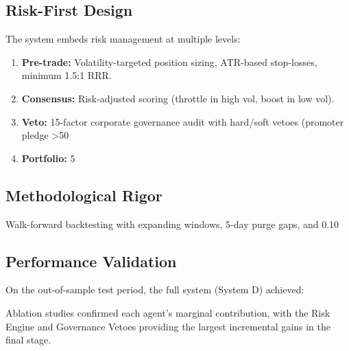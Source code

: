 \documentclass[12pt,a4paper]{report}
\begin{document}
\subsection{Risk-First Design}
The system embeds risk management at multiple levels:
\begin{enumerate}
\item \textbf{Pre-trade:} Volatility-targeted position sizing, ATR-based stop-losses, minimum 1.5:1 RRR.
\item \textbf{Consensus:} Risk-adjusted scoring (throttle in high vol, boost in low vol).
\item \textbf{Veto:} 15-factor corporate governance audit with hard/soft vetoes (promoter pledge >50%
\item \textbf{Portfolio:} 5%
\end{enumerate}

\subsection{Methodological Rigor}
Walk-forward backtesting with expanding windows, 5-day purge gaps, and 0.10%

\subsection{Performance Validation}
On the out-of-sample test period, the full system (System D) achieved:

Ablation studies confirmed each agent's marginal contribution, with the Risk Engine and Governance Vetoes providing the largest incremental gains in the final stage.
\end{document}
